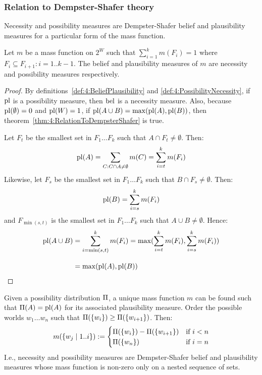 \subsubsection{Relation to Dempster-Shafer theory}

Necessity and possibility measures are Dempster-Shafer belief and plausibility
measures for a particular form of the mass function.

\begin{thm}
  \label{thm:4:RelationToDempsterShafer}
  Let $m$ be a mass function on $2^W$ such that $\sum_{i = 1}^k m(F_i) = 1$ where
  $F_i \subseteq F_{i + 1} : i = 1 .. k - 1$.
  The belief and plausibility measures of $m$ are necessity and possibility
  measures respectively.
  \begin{proof}
    By definitions~\ref{def:4:BeliefPlausibility} and
    \ref{def:4:PossibilityNecessity}, if $\operatorname*{pl}$ is a possibility measure, then
    $\operatorname*{bel}$ is a necessity measure.
    Also, because $\operatorname*{pl}(\emptyset) = 0$ and $\operatorname*{pl}(W) = 1$, if $\operatorname*{pl}(A \cup B) =
      \max(\operatorname*{pl}(A), \operatorname*{pl}(B))$, then theorem~\ref{thm:4:RelationToDempsterShafer} is
    true.

    Let $F_t$ be the smallest set in $F_1 \ldots F_k$ such that $A \cap F_t \neq
      \emptyset$.
    Then:
    \begin{equation*}
      \operatorname*{pl}(A) = \sum_{C : C \cap A \neq \emptyset} m(C) = \sum_{i = t}^k m(F_i)
    \end{equation*}
    Likewise, let $F_s$ be the smallest set in $F_1 \ldots F_k$ such that $B \cap
      F_s \neq \emptyset$.
    Then:
    \begin{equation*}
      \operatorname*{pl}(B) = \sum_{i = s}^k m(F_i)
    \end{equation*}
    and $F_{\min(s, t)}$ is the smallest set in $F_1 \ldots F_k$
    such that $A \cup B \neq \emptyset$.
    Hence:
    \begin{align*}
      \operatorname*{pl}(A \cup B)
       & = \sum_{i = \min(s, t)}^k m(F_i)
      = \max(\sum_{i = t}^k m(F_i), \sum_{i = s}^k m(F_i))
      \\[2ex]
       & = \max(\operatorname*{pl}(A), \operatorname*{pl}(B))
    \end{align*}
  \end{proof}
\end{thm}

Given a possibility distribution $\operatorname*{\Pi}$, a unique mass function $m$ can be
found such that $\operatorname*{\Pi}(A) = \operatorname*{pl}(A)$ for its associated plausibility measure.
Order the possible worlds $w_1 \ldots w_n$ such that $\operatorname*{\Pi}(\{w_i\}) \geq
  \operatorname*{\Pi}(\{w_{i + 1}\})$.
Then:
\begin{equation*}
  m(\{w_j \mid 1 .. i \}) :=
  \begin{cases}
    \operatorname*{\Pi}(\{w_i\}) - \operatorname*{\Pi}(\{w_{i + 1}\}) & \text{if } i < n
    \\
    \operatorname*{\Pi}(\{w_n\})                        & \text{if } i = n
  \end{cases}
\end{equation*}
I.e., necessity and possibility measures are Dempster-Shafer belief and
plausibility measures whose mass function is non-zero only on a nested sequence
of sets.
